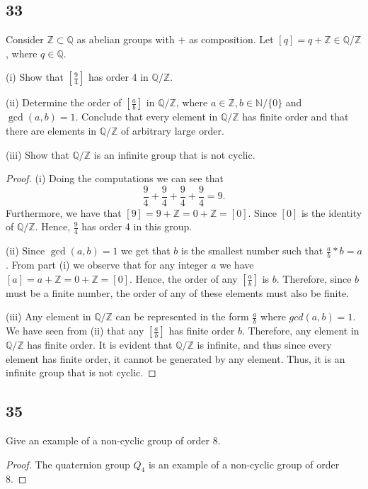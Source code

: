 \documentclass{article}
\newcommand{\N}{\mathbb{N}}
\newcommand{\Z}{\mathbb{Z}}
\newcommand{\Q}{\mathbb{Q}}
\newenvironment{hwproof}[1]
{
    #1
    \begin{proof}
}{
    \end{proof}
}
\begin{document}
\subsection*{33}
\begin{hwproof}
    {
        Consider $\Z \subset \Q$ as abelian groups with $+$ as composition.
        Let $[q] = q + \Z \in \Q / \Z$, where $q \in \Q$.

        (i) Show that $\left[\frac{9}{4}\right]$ has order 4 in $\Q / \Z$.

        (ii) Determine the order of $\left[\frac{a}{b}\right]$ in $\Q / \Z$,
        where $a \in \Z, b \in \N / \{0\}$ and $\gcd(a,b) = 1$. Conclude that
        every element in $\Q / \Z$ has finite order and that there are elements
        in $\Q / \Z$ of arbitrary large order.

        (iii) Show that $\Q / \Z$ is an infinite group that is not cyclic.
    }
    (i) Doing the computations we can see that
    \begin{equation*}
        \frac{9}{4} + \frac{9}{4} + \frac{9}{4} + \frac{9}{4} = 9.
    \end{equation*}
    Furthermore, we have that $[9] = 9 + \Z = 0 + \Z = [0]$. Since
    $[0]$ is the identity of $\Q / \Z$. Hence, $\frac{9}{4}$ has order 4 in this
    group.

    (ii) Since $\gcd(a,b) = 1$ we get that $b$ is the smallest number such that
    $\frac{a}{b} * b = a$. From part (i)
    we observe that for any integer $a$ we have $[a] = a + \Z = 0 + \Z = [0]$.
    Hence, the order of any $\left[\frac{a}{b}\right]$ is $b$.
    Therefore, since $b$ must be a finite number, the order of any of these elements
    must also be finite.

    (iii) Any element in $\Q / \Z$ can be represented in the form $\frac{a}{b}$
    where $gcd(a,b) = 1$. We have seen from (ii) that any $\left[\frac{a}{b}\right]$
    has finite order $b$. Therefore, any element in $\Q / \Z$ has finite order.
    It is evident that $\Q / \Z$ is infinite, and thus since every element has
    finite order, it cannot be generated by any element. Thus, it is an infinite
    group that is not cyclic.


\end{hwproof}

\subsection*{35}
\begin{hwproof}
    {
        Give an example of a non-cyclic group of order 8.
    }
    The quaternion group $Q_4$ is an example of a non-cyclic group of order
    8.
\end{hwproof}
\end{document}
